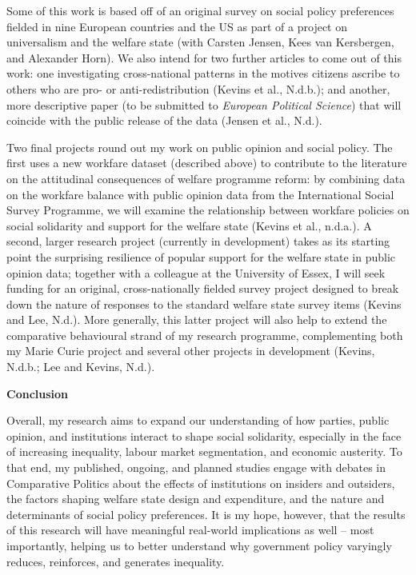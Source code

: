 \documentclass[letterpaper]{scrartcl}
\begin{document}
  Some of this work is based off of an original survey on social policy preferences fielded in nine European countries and the US as part of a project on universalism and the welfare state (with Carsten Jensen, Kees van Kersbergen, and Alexander Horn). We also intend for two further articles to come out of this work: one investigating cross-national patterns in the motives citizens ascribe to others who are pro- or anti-redistribution (Kevins et al., N.d.b.); and another, more descriptive paper (to be submitted to \textit{European Political Science}) that will coincide with the public release of the data (Jensen et al., N.d.).

  Two final projects round out my work on public opinion and social policy. The first uses a new workfare dataset (described above) to contribute to the literature on the attitudinal consequences of welfare programme reform: by combining data on the workfare balance with public opinion data from the International Social Survey Programme, we will examine the relationship between workfare policies on social solidarity and support for the welfare state (Kevins et al., n.d.a.). A second, larger research project (currently in development) takes as its starting point the surprising resilience of popular support for the welfare state in public opinion data; together with a colleague at the University of Essex, I will seek funding for an original, cross-nationally fielded survey project designed to break down the nature of responses to the standard welfare state survey items (Kevins and Lee, N.d.). More generally, this latter project will also help to extend the comparative behavioural strand of my research programme, complementing both my Marie Curie project and several other projects in development (Kevins, N.d.b.; Lee and Kevins, N.d.).

  \textbf{Conclusion}
  \vspace{-1em}

  Overall, my research aims to expand our understanding of how parties, public opinion, and institutions interact to shape social solidarity, especially in the face of increasing inequality, labour market segmentation, and economic austerity. To that end, my published, ongoing, and planned studies engage with debates in Comparative Politics about the effects of institutions on insiders and outsiders, the factors shaping welfare state design and expenditure, and the nature and determinants of social policy preferences. It is my hope, however, that the results of this research will have meaningful real-world implications as well -- most importantly, helping us to better understand why government policy varyingly reduces, reinforces, and generates inequality.
\end{document}

